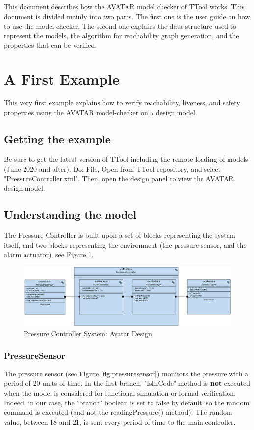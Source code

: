 \documentclass[12pt]{article}
\begin{document}
This document describes how the AVATAR model checker of TTool works. This document is divided mainly into two parts. The first one is the user guide on how to use the model-checker. The second one explains the data structure used to represent the models, the algorithm for reachability graph generation, and the properties that can be verified.

\newpage

\section{A First Example}
This very first example explains how to verify reachability, liveness, and safety properties using the AVATAR model-checker on a design model.

\subsection{Getting the example}
Be sure to get the latest version of TTool including the remote loading of models (June 2020 and after). Do: File, Open from TTool repository, and select "PressureController.xml". Then, open the design panel to view the AVATAR design model.

\subsection{Understanding the model}
The Pressure Controller is built upon a set of blocks representing the system itself, and two blocks representing the environment (the pressure sensor, and the alarm actuator), see Figure \ref{fig:pressurecontroller}.

\begin{figure}[h]
\centering
\includegraphics[width=1\textwidth]{images/PressureController.png}
\caption{Pressure Controller System: Avatar Design}
\label{fig:pressurecontroller}
\end{figure}

\subsubsection{PressureSensor}
The pressure sensor (see Figure \ref{fig:pressuresensor}) monitors the pressure with a period of 20 units of time. In the first branch, "IsInCode" method is \textbf{not} executed when the model is considered for functional simulation or formal verification. Indeed, in our case, the "branch" boolean is set to false by default, so the random command is executed (and not the readingPressure() method). The random value, between 18 and 21, is sent every period of time to the main controller.
\end{document}

